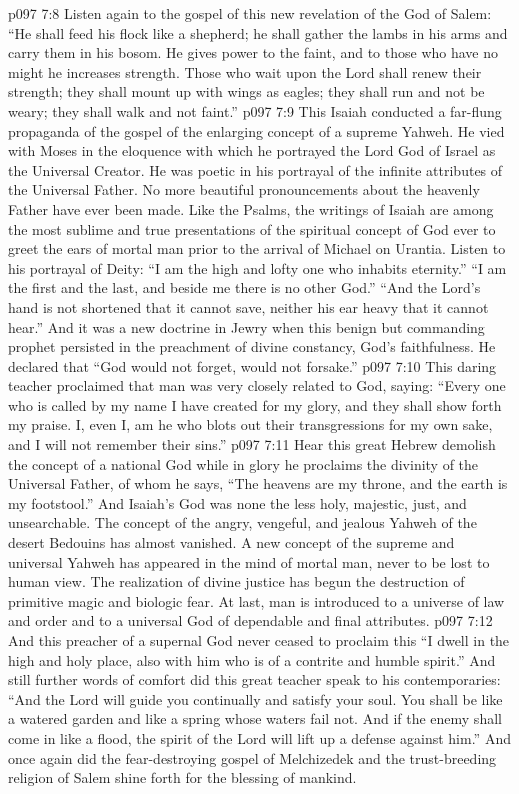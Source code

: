 \vs p097 7:8 Listen again to the gospel of this new revelation of the God of Salem: “He shall feed his flock like a shepherd; he shall gather the lambs in his arms and carry them in his bosom. He gives power to the faint, and to those who have no might he increases strength. Those who wait upon the Lord shall renew their strength; they shall mount up with wings as eagles; they shall run and not be weary; they shall walk and not faint.”
\vs p097 7:9 This Isaiah conducted a far\hyp{}flung propaganda of the gospel of the enlarging concept of a supreme Yahweh. He vied with Moses in the eloquence with which he portrayed the Lord God of Israel as the Universal Creator. He was poetic in his portrayal of the infinite attributes of the Universal Father. No more beautiful pronouncements about the heavenly Father have ever been made. Like the Psalms, the writings of Isaiah are among the most sublime and true presentations of the spiritual concept of God ever to greet the ears of mortal man prior to the arrival of Michael on Urantia. Listen to his portrayal of Deity: “I am the high and lofty one who inhabits eternity.” “I am the first and the last, and beside me there is no other God.” “And the Lord’s hand is not shortened that it cannot save, neither his ear heavy that it cannot hear.” And it was a new doctrine in Jewry when this benign but commanding prophet persisted in the preachment of divine constancy, God’s faithfulness. He declared that “God would not forget, would not forsake.”
\vs p097 7:10 This daring teacher proclaimed that man was very closely related to God, saying: “Every one who is called by my name I have created for my glory, and they shall show forth my praise. I, even I, am he who blots out their transgressions for my own sake, and I will not remember their sins.”
\vs p097 7:11 Hear this great Hebrew demolish the concept of a national God while in glory he proclaims the divinity of the Universal Father, of whom he says, “The heavens are my throne, and the earth is my footstool.” And Isaiah’s God was none the less holy, majestic, just, and unsearchable. The concept of the angry, vengeful, and jealous Yahweh of the desert Bedouins has almost vanished. A new concept of the supreme and universal Yahweh has appeared in the mind of mortal man, never to be lost to human view. The realization of divine justice has begun the destruction of primitive magic and biologic fear. At last, man is introduced to a universe of law and order and to a universal God of dependable and final attributes.
\vs p097 7:12 And this preacher of a supernal God never ceased to proclaim this  “I dwell in the high and holy place, also with him who is of a contrite and humble spirit.” And still further words of comfort did this great teacher speak to his contemporaries: “And the Lord will guide you continually and satisfy your soul. You shall be like a watered garden and like a spring whose waters fail not. And if the enemy shall come in like a flood, the spirit of the Lord will lift up a defense against him.” And once again did the fear\hyp{}destroying gospel of Melchizedek and the trust\hyp{}breeding religion of Salem shine forth for the blessing of mankind.
